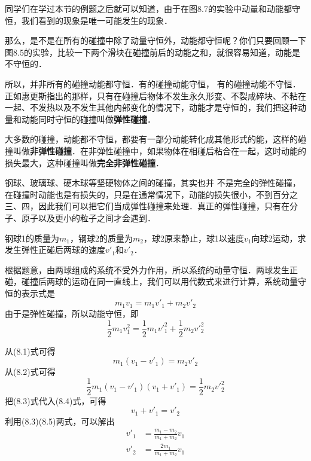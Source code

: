 同学们在学过本节的例题之后就可以知道，由于在图8.7的实验中动量和动能都守恒，我们看到的现象是唯一可能发生的现象．

那么，是不是在所有的碰撞中除了动量守恒外，动能都守恒呢？你们只要回顾一下图8.5的实验，比较一下两个滑块在碰撞前后的动能之和，就很容易知道，动能是不守恒的．

所以，并非所有的碰撞动能都守恒．有的碰撞动能守恒，
有的碰撞动能不守恒．正如惠更斯指出的那样，只有在碰撞后物体不发生永久形变、不裂成碎块、不粘在一起、不发热以及不发生其他内部变化的情况下，动能才是守恒的，我们把这种动量和动能同时守恒的碰撞叫做\textbf{弹性碰撞}．

大多数的碰撞，动能都不守恒，都要有一部分动能转化成其他形式的能，这样的碰撞叫做\textbf{非弹性碰撞}．在非弹性碰撞中，如果物体在相碰后粘合在一起，这时动能的损失最大，这种碰撞叫做\textbf{完全非弹性碰撞}．

钢球、玻璃球、硬木球等坚硬物体之间的碰撞，其实也并
不是完全的弹性碰撞，在碰撞时动能也是有损失的，只是在通常情况下，动能的损失很小，不到百分之三、四，因此我们可以把它们当成弹性碰撞来处理．真正的弹性碰撞，只有在分子、原子以及更小的粒子之间才会遇到．


\begin{example}
    钢球1的质量为$m_1$，钢球2的质量为$m_2$，球2原来静止，球1以速度$v_1$向球2运动，求发生弹性正碰后两球的速度$v'_1$和$v'_2$．
\end{example}


\begin{solution}
    根据题意，由两球组成的系统不受外力作用，所以系统的动量守恒．两球发生正碰，碰撞后两球的运动在同一直线上，我们可以用代数式来进行计算，系统动量守恒的表示式是
\begin{equation}
    m_1v_1=m_1v'_1+m_2v'_2
\end{equation}
由于是弹性碰撞，所以动能守恒，即
\begin{equation}
    \frac{1}{2}m_1v_1^2=\frac{1}{2}m_1{v'}_1^2+\frac{1}{2}m_2{v'}_2^2
\end{equation}

从(8.1)式可得
\begin{equation}
    m_1(v_1-v'_1)=m_2v'_2
\end{equation}
从(8.2)式可得
\begin{equation}
    \frac{1}{2}m_1(v_1-v'_1)(v_1+v'_1)=\frac{1}{2}m_2{v'}_2^2
\end{equation}
把(8.3)式代入(8.4)式，可得
\begin{equation}
 v_1+v'_1=v'_2   
\end{equation}
利用(8.3)(8.5)两式，可以解出
\begin{equation}
\begin{split}
    v'_1&=\frac{m_1-m_2}{m_1+m_2}v_1\\
    v'_2&=\frac{2m_1}{m_1+m_2}v_1\\
\end{split}
\end{equation}
\end{solution}


